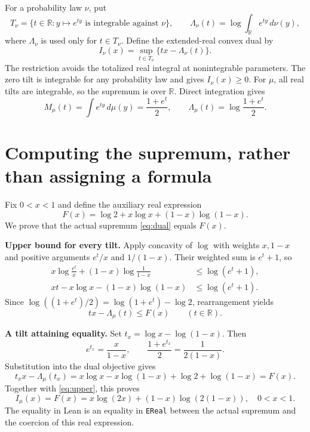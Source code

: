 \documentclass[11pt,a4paper]{article}
\newcommand{\R}{\mathbb R}
\newcommand{\code}[1]{\nolinkurl{#1}}
\begin{document}
For a probability law $\nu$, put
\[
T_\nu=\{t\in\R:y\mapsto e^{ty}\text{ is integrable against }\nu\},\qquad
\Lambda_\nu(t)=\log\int_\R e^{ty}\,d\nu(y),
\]
where $\Lambda_\nu$ is used only for $t\in T_\nu$. Define the extended-real convex dual by
\begin{equation}\label{eq:dual}
I_\nu(x)=\sup_{t\in T_\nu}\{tx-\Lambda_\nu(t)\}.
\end{equation}
The restriction avoids the totalized real integral at nonintegrable parameters. The zero tilt is integrable for any probability law and gives $I_\nu(x)\ge0$. For $\mu$, all real tilts are integrable, so the supremum is over $\R$. Direct integration gives
\begin{equation}\label{eq:mgf}
M_\mu(t)=\int e^{ty}\,d\mu(y)=\frac{1+e^t}{2},\qquad
\Lambda_\mu(t)=\log\frac{1+e^t}{2}.
\end{equation}

\section{Computing the supremum, rather than assigning a formula}
Fix $0<x<1$ and define the auxiliary real expression
\[
F(x)=\log2+x\log x+(1-x)\log(1-x).
\]
We prove that the actual supremum \eqref{eq:dual} equals $F(x)$.

\textbf{Upper bound for every tilt.}
Apply concavity of $\log$ with weights $x,1-x$ and positive arguments $e^t/x$ and $1/(1-x)$. Their weighted sum is $e^t+1$, so
\begin{align*}
x\log\frac{e^t}{x}+(1-x)\log\frac1{1-x}
&\le \log(e^t+1),\\
xt-x\log x-(1-x)\log(1-x)
&\le \log(e^t+1).
\end{align*}
Since $\log((1+e^t)/2)=\log(1+e^t)-\log2$, rearrangement yields
\begin{equation}\label{eq:upper}
tx-\Lambda_\mu(t)\le F(x)\qquad(t\in\R).
\end{equation}

\textbf{A tilt attaining equality.}
Set $t_x=\log x-\log(1-x)$. Then
\[
e^{t_x}=\frac{x}{1-x},\qquad
\frac{1+e^{t_x}}2=\frac1{2(1-x)}.
\]
Substitution into the dual objective gives
\[
t_xx-\Lambda_\mu(t_x)
=x\log x-x\log(1-x)+\log2+\log(1-x)=F(x).
\]
Together with \eqref{eq:upper}, this proves
\begin{equation}\label{eq:formula}
\boxed{\ I_\mu(x)=F(x)=x\log(2x)+(1-x)\log(2(1-x)),\quad 0<x<1.\ }
\end{equation}
The equality in Lean is an equality in \code{EReal} between the actual supremum and the coercion of this real expression.
\end{document}
